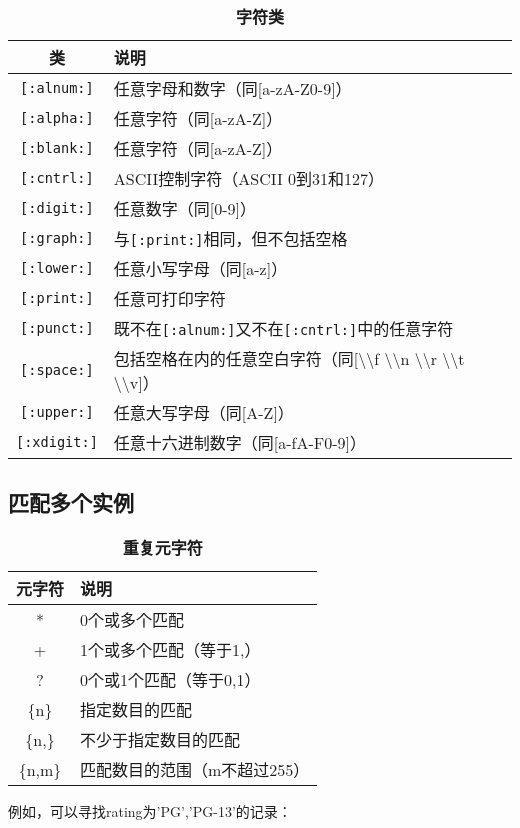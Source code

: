 \documentclass[UTF8]{article}
\begin{document}
\begin{table}[H]
        \caption{\textbf{字符类}}%
        \centering%
        \begin{tabular}{cl}%
        \toprule%
        类 & 说明 \\
        \midrule%
        \texttt{[:alnum:]} & 任意字母和数字（同[a-zA-Z0-9]） \\
        \texttt{[:alpha:]} & 任意字符（同[a-zA-Z]） \\
        \texttt{[:blank:]} & 任意字符（同[a-zA-Z]） \\
        \texttt{[:cntrl:]} & ASCII控制字符（ASCII 0到31和127） \\
        \texttt{[:digit:]} & 任意数字（同[0-9]） \\
        \texttt{[:graph:]} & 与\texttt{[:print:]}相同，但不包括空格 \\
        \texttt{[:lower:]} & 任意小写字母（同[a-z]） \\
        \texttt{[:print:]} & 任意可打印字符 \\
        \texttt{[:punct:]} & 既不在\texttt{[:alnum:]}又不在\texttt{[:cntrl:]}中的任意字符 \\
        \texttt{[:space:]} & 包括空格在内的任意空白字符（同[\textbackslash\textbackslash f \textbackslash\textbackslash n \textbackslash\textbackslash r \textbackslash\textbackslash t \textbackslash\textbackslash v]） \\
        \texttt{[:upper:]} & 任意大写字母（同[A-Z]） \\
        \texttt{[:xdigit:]} & 任意十六进制数字（同[a-fA-F0-9]） \\
        \bottomrule%
        \end{tabular}
\end{table}
 
\subsection{匹配多个实例}

\begin{table}[H]
        \caption{\textbf{重复元字符}}%
        \centering%
        \begin{tabular}{cl}%
        \toprule%
        元字符 & 说明 \\
        \midrule%
        * & 0个或多个匹配 \\
        + & 1个或多个匹配（等于{1,}） \\
        ? & 0个或1个匹配（等于{0,1}） \\
        \{n\} & 指定数目的匹配 \\
        \{n,\} & 不少于指定数目的匹配 \\
        \{n,m\} & 匹配数目的范围（m不超过255） \\
        \bottomrule%
        \end{tabular}
\end{table}
例如，可以寻找rating为'PG','PG-13'的记录：
\end{document}
